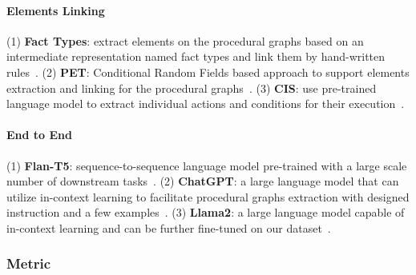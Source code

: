 \paragraph{Elements Linking}
(1) \textbf{Fact Types}: extract elements on the procedural graphs based on an intermediate representation named fact types and link them by hand-written rules~\cite{sholiq2022generating}. 
(2) \textbf{PET}: Conditional Random Fields based approach to support elements extraction and linking for the procedural graphs~\cite{bellan2022pet}. 
(3) \textbf{CIS}: use pre-trained language model to extract individual actions and conditions for their execution~\cite{bellan2022leveraging}. 

\paragraph{End to End}
(1) \textbf{Flan-T5}: sequence-to-sequence language model pre-trained with a large scale number of downstream tasks~\cite{chung2022scaling}. 
(2) \textbf{ChatGPT}: a large language model that can utilize in-context learning to facilitate procedural graphs extraction with designed instruction and a few examples~\cite{ouyang2022training}. 
(3) \textbf{Llama2}: a large language model capable of in-context learning and can be further fine-tuned on our dataset~\cite{touvron2023llama}. 


\subsubsection{Metric}

